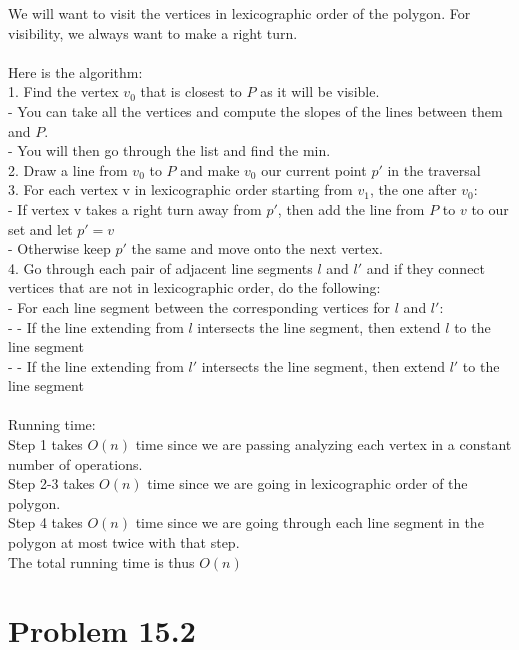\documentclass[11pt,psfig]{article}
\begin{document}
We will want to visit the vertices in lexicographic order of the polygon. 
For visibility, we always want to make a right turn. \\
\\
Here is the algorithm:\\
1. Find the vertex $v_0$ that is closest to $P$ as it will be visible. \\
- You can take all the vertices and compute the slopes of the lines between them and $P$. \\
- You will then go through the list and find the min. \\
2. Draw a line from $v_0$ to $P$ and make $v_0$ our current point $p'$ in the traversal\\
3. For each vertex v in lexicographic order starting from $v_1$, the one after $v_0$: \\
- If vertex v takes a right turn away from $p'$, then add the line from $P$ to $v$ to our set and let $p'=v$\\
- Otherwise keep $p'$ the same and move onto the next vertex. \\
4. Go through each pair of adjacent line segments $l$ and $l'$ and if they connect vertices that are not in lexicographic order, do the following:\\
- For each line segment between the corresponding vertices for $l$ and $l'$:\\
-    - If the line extending from $l$ intersects the line segment, then extend $l$ to the line segment\\
-		 - If the line extending from $l'$ intersects the line segment, then extend $l'$ to the line segment \\
\\
Running time:\\
Step 1 takes $O(n)$ time since we are passing analyzing each vertex in a constant number of operations. \\
Step 2-3 takes $O(n)$ time since we are going in lexicographic order of the polygon. \\
Step 4 takes $O(n)$ time since we are going through each line segment in the polygon at most twice with that step. \\
The total running time is thus $O(n)$



\newpage

\section*{Problem 15.2}
\end{document}
